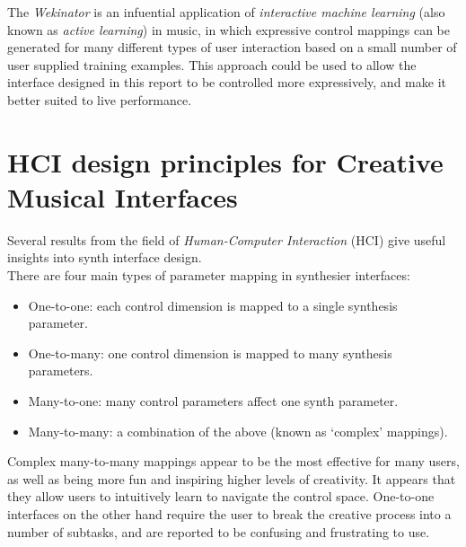 \documentclass[11pt, oneside]{report}   	%
\begin{document}
The \emph{Wekinator} \cite{Wekinator} is an infuential application of \emph{interactive machine learning} (also known as \emph{active learning}) in music, in which expressive control mappings can be generated for many different types of user interaction based on a small number of user supplied training examples. This approach could be used to allow the interface designed in this report to be controlled more expressively, and make it better suited to live performance.
\section{HCI design principles for Creative Musical Interfaces}\label{sec:Tubb}
Several results from the field of \emph{Human-Computer Interaction} (HCI) give useful insights into synth interface design.\\
There are four main types of parameter mapping in synthesier interfaces:\cite{MappingStrategies}
\begin{itemize}
\vspace{-10pt}
\setlength\itemsep{-1.2em}
\item One-to-one: each control dimension is mapped to a single synthesis parameter.
\item One-to-many: one control dimension is mapped to many synthesis parameters.
\item Many-to-one: many control parameters affect one synth parameter.
\item Many-to-many: a combination of the above (known as ‘complex’ mappings).
\end{itemize}
\vspace{-10pt}
Complex many-to-many mappings appear to be the most effective for many users, as well as being more fun and inspiring higher levels of creativity. It appears that they allow users to intuitively learn to navigate the control space. One-to-one interfaces on the other hand require the user to break the creative process into a number of subtasks, and are reported to be confusing and frustrating to use.
\end{document}

